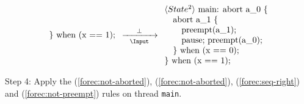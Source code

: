 \begin{equation*}
{\begin{array}{l}
				\text{\} when (x == 1);}
			\end{array}
				\xrightarrow[~~\Input~~]{\bot} 
			\begin{array}{l}
				\langle State^2 \rangle ~ \text{main: abort a\_0 \{}\\
				\text{~~~abort a\_1 \{}								\\
				\text{~~~~~~preempt(a\_1);}							\\
				\text{~~~~~~pause; preempt(a\_0);}					\\
				\text{~~~\} when (x == 0);}							\\
				\text{\} when (x == 1);}
			\end{array}
		}
\end{equation*}

\noindent
Step 4: Apply the (\ref{forec:not-aborted}), (\ref{forec:not-aborted}), (\ref{forec:seq-right}) and 
(\ref{forec:not-preempt}) rules on thread \verb$main$.
